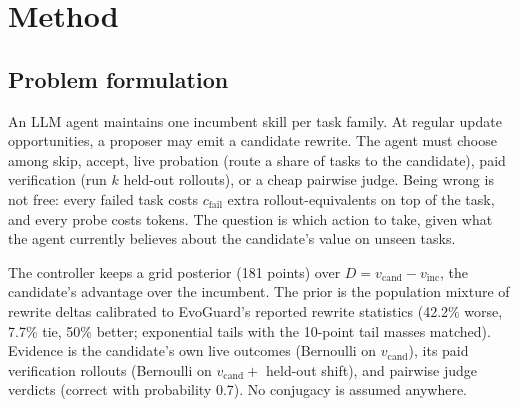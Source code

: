 \documentclass[11pt]{article}
\begin{document}
\section{Method}
\subsection{Problem formulation}
An LLM agent maintains one incumbent skill per task family.  At regular update
opportunities, a proposer may emit a candidate rewrite.  The agent must choose among skip,
accept, live probation (route a share of tasks to the candidate), paid verification (run
$k$ held-out rollouts), or a cheap pairwise judge.  Being wrong is not free: every failed
task costs $c_{\text{fail}}$ extra rollout-equivalents on top of the task, and every probe
costs tokens.  The question is which action to take, given what the agent currently believes
about the candidate's value on unseen tasks.

The controller keeps a grid posterior (181 points) over
$D = v_{\text{cand}} - v_{\text{inc}}$, the candidate's advantage over the incumbent.  The
prior is the population mixture of rewrite deltas calibrated to EvoGuard's reported rewrite
statistics (42.2\% worse, 7.7\% tie, 50\% better; exponential tails with the 10-point tail
masses matched).  Evidence is the candidate's own live outcomes (Bernoulli on
$v_{\text{cand}}$), its paid verification rollouts (Bernoulli on $v_{\text{cand}} +$
held-out shift), and pairwise judge verdicts (correct with probability 0.7).  No conjugacy
is assumed anywhere.
\end{document}
